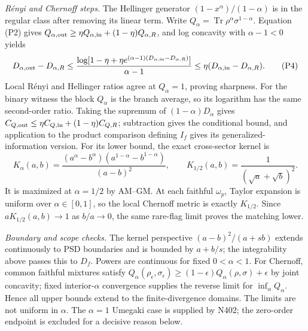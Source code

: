 \documentclass[10pt,a4paper]{article}
\newcommand{\Tr}{\operatorname{Tr}}
\begin{document}
\textit{R\'enyi and Chernoff steps.} The Hellinger generator $(1-x^\alpha)/(1-\alpha)$ is in the regular class after removing its linear term. Write $Q_\alpha=\Tr\rho^\alpha\sigma^{1-\alpha}$. Equation (P2) gives $Q_{\alpha,\rm out}\ge\eta Q_{\alpha,\rm in}+(1-\eta)Q_{\alpha,R}$, and log concavity with $\alpha-1<0$ yields
\[
 D_{\alpha,\rm out}-D_{\alpha,R}
 \le\frac{\log[1-\eta+\eta e^{(\alpha-1)(D_{\alpha,\rm in}-D_{\alpha,R})}]}{\alpha-1}
 \le\eta(D_{\alpha,\rm in}-D_{\alpha,R}). \tag{P4}
\]
Local R\'enyi and Hellinger ratios agree at $Q_\alpha=1$, proving sharpness. For the binary witness the block $Q_\alpha$ is the branch average, so its logarithm has the same second-order ratio. Taking the supremum of $(1-\alpha)D_\alpha$ gives
$C_{Q,\rm out}\le\eta C_{Q,\rm in}+(1-\eta)C_{Q,R}$; subtraction gives the conditional bound, and application to the product comparison defining $I_f$ gives its generalized-information version. For its lower bound, the exact cross-sector kernel is
\[
 K_\alpha(a,b)=\frac{(a^\alpha-b^\alpha)(a^{1-\alpha}-b^{1-\alpha})}{(a-b)^2},\qquad
 K_{1/2}(a,b)=\frac1{(\sqrt a+\sqrt b)^2}.
\]
It is maximized at $\alpha=1/2$ by AM--GM. At each faithful $\omega_p$, Taylor expansion is uniform over $\alpha\in[0,1]$, so the local Chernoff metric is exactly $K_{1/2}$. Since $aK_{1/2}(a,b)\to1$ as $b/a\to0$, the same rare-flag limit proves the matching lower.

\textit{Boundary and scope checks.} The kernel perspective $(a-b)^2/(a+sb)$ extends continuously to PSD boundaries and is bounded by $a+b/s$; the integrability above passes this to $D_f$. Powers are continuous for fixed $0<\alpha<1$. For Chernoff, common faithful mixtures satisfy $Q_\alpha(\rho_\epsilon,\sigma_\epsilon)\ge(1-\epsilon)Q_\alpha(\rho,\sigma)+\epsilon$ by joint concavity; fixed interior-$\alpha$ convergence supplies the reverse limit for $\inf_\alpha Q_\alpha$. Hence all upper bounds extend to the finite-divergence domains. The limits are not uniform in $\alpha$. The $\alpha=1$ Umegaki case is supplied by N402; the zero-order endpoint is excluded for a decisive reason below.
\end{document}
